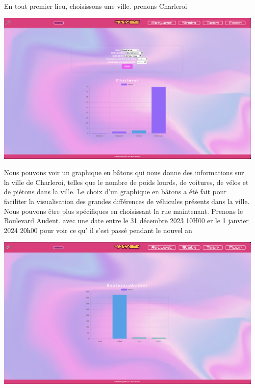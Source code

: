\documentclass{article}
\begin{document}
En tout premier lieu, choisissons une ville.
prenons Charleroi

\begin{center}
    \includegraphics[scale=0.3]{logo/Request_c.png}
\end{center}

Nous pouvons voir un graphique en bâtons qui nous donne des informations sur la ville de Charleroi, telles que le nombre de poids lourds, de voitures, de vélos et de piétons dans la ville. Le choix d'un graphique en bâtons a été fait pour faciliter la visualisation des grandes différences de véhicules présents dans la ville.\\

Nous pouvons être plus spécifiques en choisissant la rue maintenant. Prenons le Boulevard Audent. avec une date entre le 31 décembre 2023 10H00 er le 1 janvier 2024 20h00 pour voir ce qu' il s'est passé pendant le nouvel an 

\begin{center}
    \includegraphics[scale=0.3]{logo/boulevard.png}
\end{center}
\end{document}
